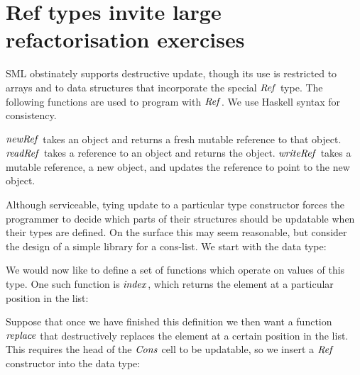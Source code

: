 \clearpage{}
\section{Ref types invite large refactorisation exercises}
\label{intro:ref-types}
SML obstinately supports destructive update, though its use is restricted to arrays and to data structures that incorporate the special $\operatorname{\mathit{Ref}}$ type. The following functions are used to program with $\operatorname{\mathit{Ref}}$. We use Haskell syntax for consistency.


$\operatorname{\mathit{newRef}}$ takes an object and returns a fresh mutable reference to that object. $\operatorname{\mathit{readRef}}$ takes a reference to an object and returns the object. $\operatorname{\mathit{writeRef}}$ takes a mutable reference, a new object, and updates the reference to point to the new object.

Although serviceable, tying update to a particular type constructor forces the programmer to decide which parts of their structures should be updatable when their types are defined. On the surface this may seem reasonable, but consider the design of a simple library for a cons-list. We start with the data type:


We would now like to define a set of functions which operate on values of this type. One such function is $\operatorname{\mathit{index}}$, which returns the element at a particular position in the list:


Suppose that once we have finished this definition we then want a function $\operatorname{\mathit{replace}}$ that destructively replaces the element at a certain position in the list. This requires the head of the $\operatorname{\mathit{Cons}}$ cell to be updatable, so we insert a $\operatorname{\mathit{Ref}}$ constructor into the data type:

